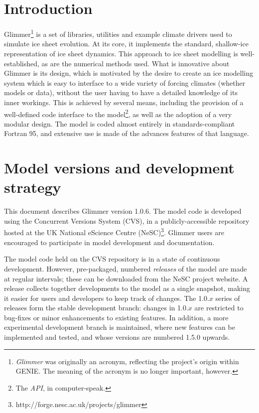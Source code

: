 \section{Introduction}
%
Glimmer\footnote{{\it Glimmer} was originally an acronym, reflecting
  the project's origin within GENIE. The meaning of the acronym is no
  longer important, however.} is a set of libraries, utilities and
example climate drivers used to simulate ice sheet evolution. At its
core, it implements the standard, shallow-ice representation of ice
sheet dynamics. This approach to ice sheet modelling is
well-established, as are the numerical methods used. What is
innovative about Glimmer is its design, which is motivated by the
desire to create an ice modelling system which is easy to interface to
a wide variety of forcing climates (whether models or data), without
the user having to have a detailed knowledge of its inner
workings. This is achieved by several means, including the provision
of a well-defined code interface to the model\footnote{The {\it API},
in computer-speak.}, as well as the adoption of a very modular
design. The model is coded almost entirely in standards-compliant
Fortran 95, and extensive use is made of the advances features of that language.
%
\section{Model versions and development strategy}
\label{intro-versions}
%
This document describes Glimmer version 1.0.6. The model code is
developed using the Concurrent Versions System (CVS), in a
publicly-accessible repository hosted at the UK National
eScience Centre (NeSC)\footnote{http://forge.nesc.ac.uk/projects/glimmer}. Glimmer
users are encouraged to participate in model 
development and documentation.

The model code held on the CVS repository is in a state of continuous
development. However, pre-packaged, numbered \emph{releases} of the model are
made at regular intervals; these can be downloaded from the NeSC
project website. A release collects together developments to the
model as a single snapshot, making it easier for users and
developers to keep track of changes. The 1.0.$x$ series of releases form the stable
development branch: changes in 1.0.$x$ are restricted to bug-fixes or minor
enhancements to existing features. In addition, a more experimental
development branch is maintained, where new features can be
implemented and tested, and whose versions are numbered 1.5.0 upwards.

